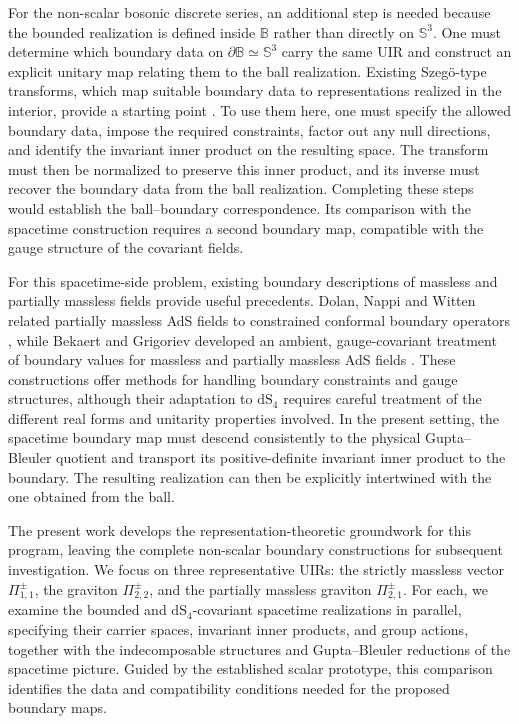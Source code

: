 \documentclass{SciPost}
\begin{document}
For the non-scalar bosonic discrete series, an additional step is needed because the bounded realization is defined inside $\mathbb{B}$ rather than directly on $\mathbb{S}^{3}$. One must determine which boundary data on $\partial\mathbb{B}\simeq\mathbb{S}^{3}$ carry the same UIR and construct an explicit unitary map relating them to the ball realization. Existing Szeg\"o-type transforms, which map suitable boundary data to representations realized in the interior, provide a starting point \cite{KnappWallach1976, KnappWallach1980, Seppanen2009}. To use them here, one must specify the allowed boundary data, impose the required constraints, factor out any null directions, and identify the invariant inner product on the resulting space. The transform must then be normalized to preserve this inner product, and its inverse must recover the boundary data from the ball realization. Completing these steps would establish the ball--boundary correspondence. Its comparison with the spacetime construction requires a second boundary map, compatible with the gauge structure of the covariant fields.

For this spacetime-side problem, existing boundary descriptions of massless and partially massless fields provide useful precedents. Dolan, Nappi and Witten related partially massless AdS fields to constrained conformal boundary operators \cite{DolanNappiWitten2001}, while Bekaert and Grigoriev developed an ambient, gauge-covariant treatment of boundary values for massless and partially massless AdS fields \cite{BekaertGrigoriev2013}. These constructions offer methods for handling boundary constraints and gauge structures, although their adaptation to $\mathrm{dS}_{4}$ requires careful treatment of the different real forms and unitarity properties involved. In the present setting, the spacetime boundary map must descend consistently to the physical Gupta--Bleuler quotient and transport its positive-definite invariant inner product to the boundary. The resulting realization can then be explicitly intertwined with the one obtained from the ball.

The present work develops the representation-theoretic groundwork for this program, leaving the complete non-scalar boundary constructions for subsequent investigation. We focus on three representative UIRs: the strictly massless vector $\Pi^\pm_{1,1}$, the graviton $\Pi^\pm_{2,2}$, and the partially massless graviton $\Pi^\pm_{2,1}$. For each, we examine the bounded and $\mathrm{dS}_{4}$-covariant spacetime realizations in parallel, specifying their carrier spaces, invariant inner products, and group actions, together with the indecomposable structures and Gupta--Bleuler reductions of the spacetime picture. Guided by the established scalar prototype, this comparison identifies the data and compatibility conditions needed for the proposed boundary maps.
\end{document}
